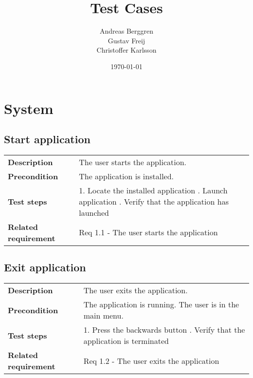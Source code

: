 \documentclass[a4paper,titlepage]{article}
\title{Test Cases}
\author{Andreas Berggren\\
        Gustav Freij\\
        Christoffer Karlsson}
\date{\today}
\begin{document}
\maketitle

\tableofcontents
\newpage

\setcounter{page}{1}

\renewcommand{\arraystretch}{1.5}

\section{System}
\subsection{Start application}
\begin{tabularx}{\textwidth}{lX}
	\textbf{Description}	&
		The user starts the application.\\
	\textbf{Precondition}	&
		The application is installed.\\
	\textbf{Test steps}	&
		1. Locate the installed application \newline
		2. Launch application \newline
		3. Verify that the application has launched \\
	\textbf{Related requirement}	&
		Req 1.1 - The user starts the application \\
\end{tabularx}

\subsection{Exit application}
\begin{tabularx}{\textwidth}{lX}
	\textbf{Description}	&
		The user exits the application.\\
	\textbf{Precondition}	&
		The application is running. \newline
		The user is in the main menu.\\
	\textbf{Test steps}	&
		1. Press the backwards button	\newline
		2. Verify that the application is terminated	\\
	\textbf{Related requirement}	&
		Req 1.2 - The user exits the application \\
\end{tabularx}
\end{document}
